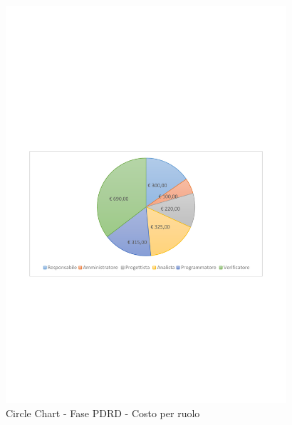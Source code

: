 \documentclass[../PianoProgetto.tex]{subfiles}
\begin{document}
	\begin{figure}[!h]
		\centering
		\includegraphics[width=0.93\textwidth , trim=2cm 9.5cm 2cm 11cm]{grafici/PDRD/PDRD-costo}
			\caption{Circle Chart - Fase PDRD - Costo per ruolo}
		\label{fig:CircleChart-fasePDRD_costo_r}
	\end{figure}
\vfill	
\newpage
\vfill
\end{document}
